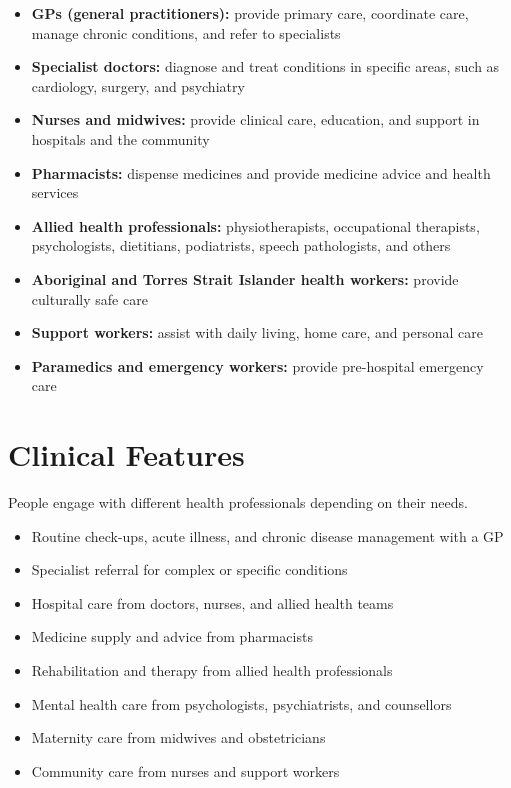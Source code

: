 \begin{itemize}
    \item \textbf{GPs (general practitioners):} provide primary care, coordinate care, manage chronic conditions, and refer to specialists
    \item \textbf{Specialist doctors:} diagnose and treat conditions in specific areas, such as cardiology, surgery, and psychiatry
    \item \textbf{Nurses and midwives:} provide clinical care, education, and support in hospitals and the community
    \item \textbf{Pharmacists:} dispense medicines and provide medicine advice and health services
    \item \textbf{Allied health professionals:} physiotherapists, occupational therapists, psychologists, dietitians, podiatrists, speech pathologists, and others
    \item \textbf{Aboriginal and Torres Strait Islander health workers:} provide culturally safe care
    \item \textbf{Support workers:} assist with daily living, home care, and personal care
    \item \textbf{Paramedics and emergency workers:} provide pre-hospital emergency care
\end{itemize}

\section*{Clinical Features}
People engage with different health professionals depending on their needs.

\begin{itemize}
    \item Routine check-ups, acute illness, and chronic disease management with a GP
    \item Specialist referral for complex or specific conditions
    \item Hospital care from doctors, nurses, and allied health teams
    \item Medicine supply and advice from pharmacists
    \item Rehabilitation and therapy from allied health professionals
    \item Mental health care from psychologists, psychiatrists, and counsellors
    \item Maternity care from midwives and obstetricians
    \item Community care from nurses and support workers
\end{itemize}

